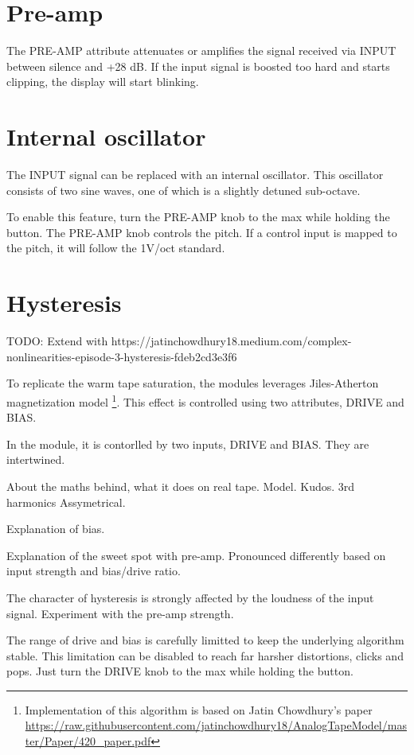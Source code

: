 \documentclass[11pt]{article}
\begin{document}
\begin{minipage}[t]{0.45\textwidth}
\setlength{\parskip}{6pt}
\section{Pre-amp}

The PRE-AMP attribute attenuates or amplifies the signal received via INPUT
between silence and +28 dB. If the input signal is boosted too hard and starts
clipping, the display will start blinking.

\section{Internal oscillator}

The INPUT signal can be replaced with an internal oscillator. This oscillator
consists of two sine waves, one of which is a slightly detuned sub-octave.

To enable this feature, turn the PRE-AMP knob to the max while holding the
button. The PRE-AMP knob controls the pitch. If a control input is mapped to the
pitch, it will follow the 1V/oct standard.

\section{Hysteresis}

TODO: Extend with https://jatinchowdhury18.medium.com/complex-nonlinearities-episode-3-hysteresis-fdeb2cd3e3f6

To replicate the warm tape saturation, the modules leverages Jiles-Atherton
magnetization model \footnote{
  Implementation of this algorithm is based on Jatin Chowdhury's paper
  \url{https://raw.githubusercontent.com/jatinchowdhury18/AnalogTapeModel/master/Paper/420_paper.pdf}
}. This effect is controlled using two attributes, DRIVE and BIAS.

In the module, it is contorlled by two inputs, DRIVE and BIAS. They are
intertwined. 

About the maths behind, what it does on real tape. Model. Kudos. 3rd harmonics
Assymetrical. 

Explanation of bias.

Explanation of the sweet spot with pre-amp. Pronounced differently based on input strength and bias/drive ratio.

The character of hysteresis is strongly affected by the loudness of the input
signal. Experiment with the pre-amp strength.

The range of drive and bias is carefully limitted to keep the underlying
algorithm stable. This limitation can be disabled to reach far harsher
distortions, clicks and pops. Just turn the DRIVE knob to the max while holding
the button.

\end{minipage}%
\end{document}
